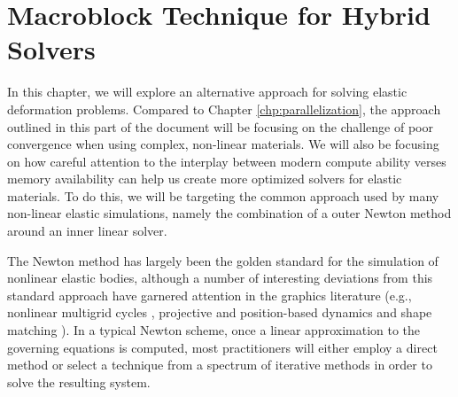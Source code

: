 \chapter{Macroblock Technique for Hybrid Solvers}
\label{chp:macroblocks}

In this chapter, we will explore an alternative approach for solving
elastic deformation problems. Compared to Chapter
\ref{chp:parallelization}, the approach outlined in this part of the
document will be focusing on the challenge of poor convergence when
using complex, non-linear materials. We will also be focusing on how
careful attention to the interplay between modern compute ability
verses memory availability can help us create more optimized solvers
for elastic materials. To do this, we will be targeting the common
approach used by many non-linear elastic simulations, namely the
combination of a outer Newton method around an inner linear solver.

The Newton method has largely been the golden standard for the
simulation of nonlinear elastic bodies, although a number of
interesting deviations from this standard approach have garnered
attention in the graphics literature (e.g., nonlinear multigrid cycles
\cite{ZhuSTB:2010}, projective and position-based dynamics
\cite{MuellHHR:2007,BouazMLKP:2014,Wang:2015} and shape matching
\cite{RiverJ:2007}). In a typical Newton scheme, once a linear
approximation to the governing equations is computed, most
practitioners will either employ a direct method or select a technique
from a spectrum of iterative methods in order to solve the resulting
system.


